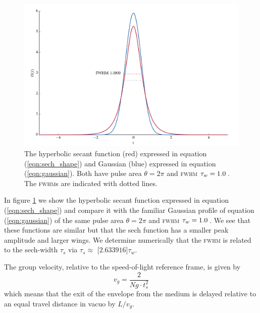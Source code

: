     \begin{figure}[]
      \includegraphics[width=\linewidth]
        {figs/03_nonlinear/plot_sech_vs_gaussian_fig1.pdf}
      \caption{
      The hyperbolic secant function (red) expressed in equation
      (\ref{eqn:sech_shape}) and Gaussian (blue) expressed in equation
      (\ref{eqn:gaussian}). Both have pulse area $\theta = 2\pi$ and
      \textsc{fwhm} $\tau_w = \unit[1.0]{}$. The \textsc{fwhm}s are indicated
      with dotted lines.
      }
      \label{fig:sech_vs_gaussian}
    \end{figure}

    In figure \ref{fig:sech_vs_gaussian} we show the hyperbolic secant function
    expressed in equation (\ref{eqn:sech_shape}) and compare it with the
    familiar Gaussian profile of equation (\ref{eqn:gaussian}) of the same pulse
    area $\theta = 2\pi$ and \textsc{fwhm} $\tau_w = \unit[1.0]{}$. We see that
    these functions are similar but that the sech function has a smaller peak
    amplitude and larger wings. We determine numerically that the \textsc{fwhm}
    is related to the sech-width $\tau_s$ via $\tau_s \approx $
    \unit[$2.633916$]{$\tau_w$}.
    
    The group velocity, relative to the speed-of-light reference frame, is given
    by
    \begin{equation}
      v_g = \frac{2}{Ng \cdot t_s^2}
      \label{eqn:soliton_group_velocity}
    \end{equation}
    which means that the exit of the envelope from the medium is delayed
    relative to an equal travel distance in vacuo by $L/v_g$.

